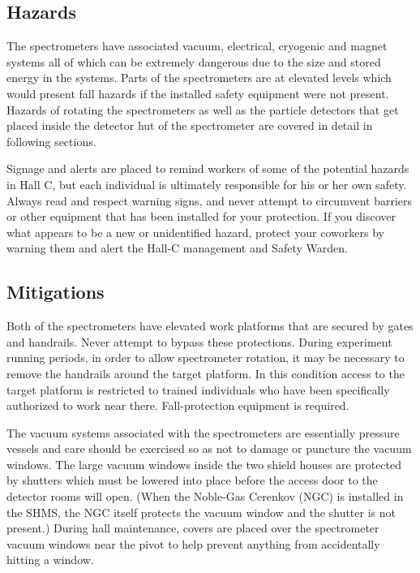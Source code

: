 \begin{safetyen}{0}{0}
\label{sec:hrs-safety}

\subsection{Hazards}

The spectrometers have associated vacuum, electrical, cryogenic and
magnet systems all of which can be extremely dangerous due to the size
and stored energy in the systems.  
Parts of the spectrometers are at elevated levels which would present fall
hazards if the installed safety equipment were not present.
Hazards of rotating the
spectrometers as well as the particle detectors that get placed inside
the detector hut of the spectrometer are covered in detail in
following sections.

Signage and alerts are placed to remind workers of some of the potential hazards
in Hall C, but each individual is ultimately responsible for his or her own 
safety. Always read and respect warning signs, and never attempt to 
circumvent barriers or other equipment
that has been installed for your protection. If you discover what appears to be a
new or unidentified hazard, protect your coworkers by warning them
and alert the Hall-C management and Safety Warden.

\subsection{Mitigations}

Both of the spectrometers have elevated work platforms that are secured by
gates and handrails. Never attempt to bypass these protections. During experiment
running periods, in order to allow spectrometer rotation, it may be necessary to
remove the handrails around the target platform. In this condition access to the 
target platform is restricted to trained individuals who have been specifically
authorized to work near there. Fall-protection equipment is required.

The vacuum systems associated with the spectrometers are essentially 
pressure vessels and care should be exercised so as not to damage or puncture the 
vacuum windows.   The large vacuum windows inside the two shield houses are protected
by shutters which must be lowered into place before the access door to the
detector rooms will open. (When the Noble-Gas Cerenkov (NGC) is installed in the SHMS, 
the NGC itself protects the vacuum window and the shutter is not present.)
During hall maintenance, covers are placed over the spectrometer
vacuum windows near the pivot
to help prevent anything from accidentally hitting a window.


\end{safetyen}
